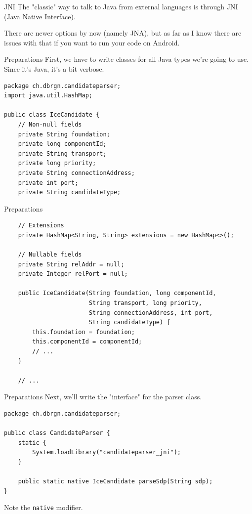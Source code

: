 \documentclass[aspectratio=1610,14pt,t]{beamer}
\begin{document}
\begin{frame}[c]{JNI}
  The "classic" way to talk to Java from external languages is through JNI (Java
  Native Interface).

  There are newer options by now (namely JNA), but as far as I know there are
  issues with that if you want to run your code on Android.
\end{frame}

\begin{frame}[c,fragile]{Preparations}
  First, we have to write classes for all Java types we're going to use. Since
  it's Java, it's a bit verbose.

  \begin{verbatim}
package ch.dbrgn.candidateparser;
import java.util.HashMap;

public class IceCandidate {
    // Non-null fields
    private String foundation;
    private long componentId;
    private String transport;
    private long priority;
    private String connectionAddress;
    private int port;
    private String candidateType;
  \end{verbatim}
\end{frame}

\begin{frame}[c,fragile]{Preparations}
  \begin{verbatim}
    // Extensions
    private HashMap<String, String> extensions = new HashMap<>();

    // Nullable fields
    private String relAddr = null;
    private Integer relPort = null;

    public IceCandidate(String foundation, long componentId,
                        String transport, long priority,
                        String connectionAddress, int port,
                        String candidateType) {
        this.foundation = foundation;
        this.componentId = componentId;
        // ...
    }

    // ...
  \end{verbatim}
\end{frame}

\begin{frame}[c,fragile]{Preparations}
  Next, we'll write the "interface" for the parser class.

  \begin{verbatim}
package ch.dbrgn.candidateparser;

public class CandidateParser {
    static {
        System.loadLibrary("candidateparser_jni");
    }

    public static native IceCandidate parseSdp(String sdp);
}
  \end{verbatim}

Note the \texttt{native} modifier.
\end{frame}
\end{document}
